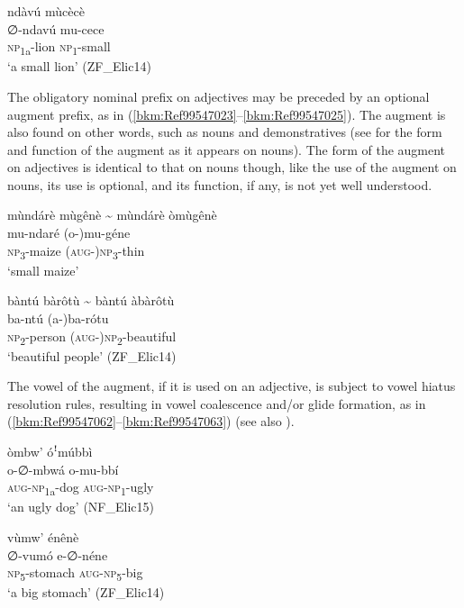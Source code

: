\ea
\label{bkm:Ref496804533}
ndàvú mùcècè\\
\gll ∅-ndavú  mu-cece\\
\textsc{np}\textsubscript{1a}-lion  \textsc{np}\textsubscript{1}-small\\
\glt ‘a small lion’ (ZF\_Elic14)
\z

The obligatory nominal prefix on adjectives may be preceded by an optional augment prefix, as in (\ref{bkm:Ref99547023}--\ref{bkm:Ref99547025}). The augment is also found on other words, such as nouns and demonstratives (see  for the form and function of the augment as it appears on nouns). The form of the augment on adjectives is identical to that on nouns though, like the use of the augment on nouns, its use is optional, and its function, if any, is not yet well understood.

\ea
\label{bkm:Ref99547023}
mùndárè mùgênè {\textasciitilde} mùndárè òmùgênè\\
\gll mu-ndaré  (o-)mu-géne\\
\textsc{np}\textsubscript{3}-maize  (\textsc{aug}-)\textsc{np}\textsubscript{3}-thin\\
\glt ‘small maize’
\z

\ea
\label{bkm:Ref99547025}
bàntú bàrôtù {\textasciitilde} bàntú àbàrôtù\\
\gll ba-ntú  (a-)ba-rótu\\
\textsc{np}\textsubscript{2}-person  (\textsc{aug}-)\textsc{np}\textsubscript{2}-beautiful\\
\glt ‘beautiful people’ (ZF\_Elic14)
\z

The vowel of the augment, if it is used on an adjective, is subject to vowel hiatus resolution rules, resulting in vowel coalescence and/or glide formation, as in (\ref{bkm:Ref99547062}--\ref{bkm:Ref99547063}) (see also ).

\ea
\label{bkm:Ref99547062}
òmbw’ óꜝmúbbì\\
\gll o-∅-mbwá    o-mu-bbí\\
\textsc{aug}-\textsc{np}\textsubscript{1a}-dog  \textsc{aug}-\textsc{np}\textsubscript{1}-ugly\\
\glt ‘an ugly dog’ (NF\_Elic15)
\z

\ea
\label{bkm:Ref99547063}
vùmw’ énênè\\
\gll ∅-vumó  e-∅-néne\\
\textsc{np}\textsubscript{5}-stomach  \textsc{aug}-\textsc{np}\textsubscript{5}-big\\
\glt ‘a big stomach’ (ZF\_Elic14)
\z

